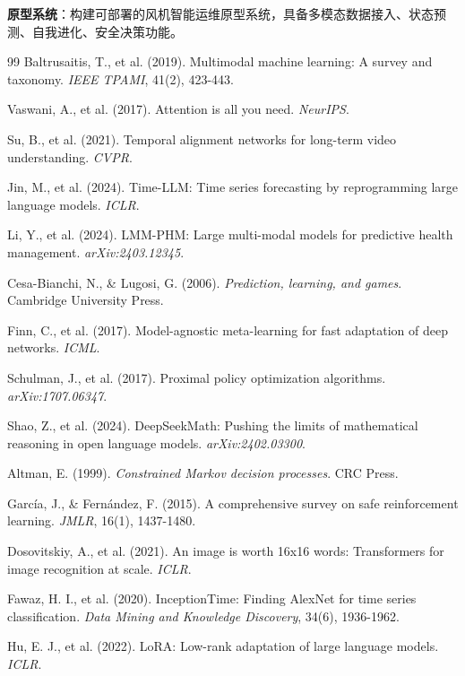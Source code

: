 \documentclass[12pt,a4paper]{article}
\begin{document}
\textbf{原型系统}：构建可部署的风机智能运维原型系统，具备多模态数据接入、状态预测、自我进化、安全决策功能。

\begin{thebibliography}{99}
Baltrusaitis, T., et al. (2019). Multimodal machine learning: A survey and taxonomy. \textit{IEEE TPAMI}, 41(2), 423-443.

Vaswani, A., et al. (2017). Attention is all you need. \textit{NeurIPS}.

Su, B., et al. (2021). Temporal alignment networks for long-term video understanding. \textit{CVPR}.

Jin, M., et al. (2024). Time-LLM: Time series forecasting by reprogramming large language models. \textit{ICLR}.

Li, Y., et al. (2024). LMM-PHM: Large multi-modal models for predictive health management. \textit{arXiv:2403.12345}.

Cesa-Bianchi, N., \& Lugosi, G. (2006). \textit{Prediction, learning, and games}. Cambridge University Press.

Finn, C., et al. (2017). Model-agnostic meta-learning for fast adaptation of deep networks. \textit{ICML}.

Schulman, J., et al. (2017). Proximal policy optimization algorithms. \textit{arXiv:1707.06347}.

Shao, Z., et al. (2024). DeepSeekMath: Pushing the limits of mathematical reasoning in open language models. \textit{arXiv:2402.03300}.

Altman, E. (1999). \textit{Constrained Markov decision processes}. CRC Press.

García, J., \& Fernández, F. (2015). A comprehensive survey on safe reinforcement learning. \textit{JMLR}, 16(1), 1437-1480.

Dosovitskiy, A., et al. (2021). An image is worth 16x16 words: Transformers for image recognition at scale. \textit{ICLR}.

Fawaz, H. I., et al. (2020). InceptionTime: Finding AlexNet for time series classification. \textit{Data Mining and Knowledge Discovery}, 34(6), 1936-1962.

Hu, E. J., et al. (2022). LoRA: Low-rank adaptation of large language models. \textit{ICLR}.


\end{thebibliography}
\end{document}
